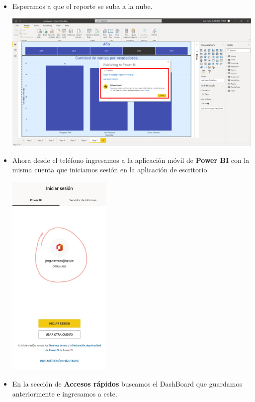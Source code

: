 \documentclass{article}
\begin{document}
\begin{enumerate}[\tab 1.]
\begin{itemize}
\begin{center}
            \end{center}
            \item Esperamos a que el reporte se suba a la nube.
            \begin{center}
                \includegraphics[width=13cm]{./images/25.6.png}
            \end{center}
            \newpage
            \item Ahora desde el teléfono ingresamos a la aplicación móvil de \textbf{Power BI} con la misma cuenta que iniciamos sesión en la aplicación de escritorio.
            \begin{center}
                \includegraphics[width=5cm]{./images/25.7.png}
            \end{center}
            \newpage
            \item En la sección de \textbf{Accesos rápidos} buscamos el DashBoard que guardamos anteriormente e ingresamos a este.
            \begin{center}

\end{center}
\end{itemize}
\end{enumerate}
\end{document}
